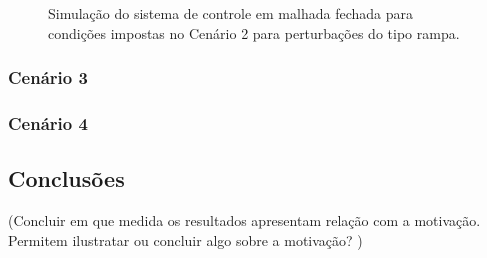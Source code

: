 \begin{figure}[!ht]
    \caption{Simulação do sistema de controle em malhada fechada para condições
    impostas no Cenário 2 para perturbações do tipo rampa.}
    \vspace{-10pt}
    \hspace{-30pt}
    \label{fig:resultado-desafio1-cenario2-b}
    \begin{minipage}{\linewidth}
        
    \end{minipage}
\end{figure}

\subsubsection{Cenário 3}
\subsubsection{Cenário 4}

\subsection{Conclusões}
(Concluir em que medida os resultados apresentam relação com a motivação.
Permitem ilustratar ou concluir algo sobre a motivação? )